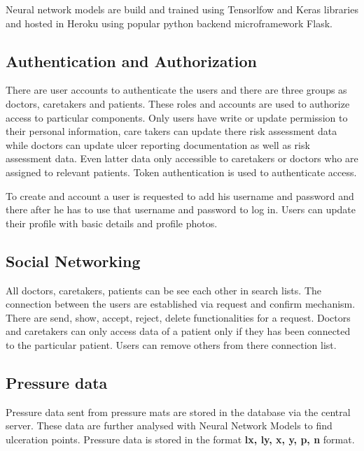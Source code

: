 Neural network models are build and trained using Tensorlfow\textsuperscript{\textregistered} and Keras\textsuperscript{\textregistered} libraries and hosted in Heroku\textsuperscript{\textregistered} using popular python backend microframework Flask\textsuperscript{\textregistered}.


\subsection{Authentication and Authorization}

There are user accounts to authenticate the users and there are three groups as doctors, caretakers and patients. These roles and accounts are used to authorize access to particular components. Only users have write or update permission to their personal information, care takers can update there risk assessment data while doctors can update ulcer reporting documentation as well as risk assessment data. Even latter data only accessible to caretakers or doctors who are assigned to relevant patients. Token authentication is used to authenticate access.

To create and account a user is requested to add his username and password and there after he has to use that username and password to log in. Users can update their profile with basic details and profile photos.

\subsection{Social Networking}

All doctors, caretakers, patients can be see each other in search lists. The connection between the users are established via request and confirm mechanism. There are send, show, accept, reject, delete functionalities for a request. Doctors and caretakers can only access data of a patient only if they has been connected to the particular patient. Users can remove others from there connection list. 

\subsection{Pressure data}

Pressure data sent from pressure mats are stored in the database via the central server. These data are further analysed with Neural Network Models to find ulceration points. Pressure data is stored in the format \textbf{lx, ly, x, y, p, n} format. 

